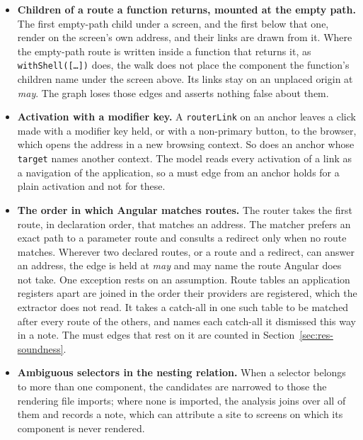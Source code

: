 \begin{itemize}[nosep]
execution model of Claim~\ref{claim:must}: the claim holds only on executions they do not describe. A
navigation is demoted when code that runs after it, before the event is handled, may start another
(Section~\ref{sec:model}). Whether that code may navigate is read through the calls the reader can
resolve to a body in the application.
Such a body is a member of the class, a function of the file, or a method the checker resolves on a
typed receiver. A call into a library, through a receiver the checker cannot type,
or into code loaded at run time is taken not to navigate.
A navigation followed by such a call can therefore be published as must although the call cancels it. The reader does not follow a navigation scheduled for later, nor the other listeners one event reaches.
\item \textbf{Children of a route a function returns, mounted at the empty path.} The first empty-path
child under a screen, and the first below that one, render on the screen's own address, and their links
are drawn from it. Where the empty-path route is written inside a function that returns it, as
\texttt{withShell([\ldots])} does, the walk does not place the component the function's children name
under the screen above.
Its links stay on an unplaced origin at \emph{may}. The graph loses those
edges and asserts nothing false about them.
\item \textbf{Activation with a modifier key.} A \texttt{routerLink} on an anchor leaves a click made
with a modifier key held, or with a non-primary button, to the browser, which opens the address in a new
browsing context.
So does an anchor whose \texttt{target} names another context. The model reads every
activation of a link as a navigation of the application, so a must edge from an anchor holds for a plain
activation and not for these.
\item \textbf{The order in which Angular matches routes.} The router takes the first route, in
declaration order, that matches an address.
The matcher prefers an exact path to a parameter route and consults a redirect only when no route
matches. Wherever two declared routes, or a route and a redirect,
can answer an address, the edge is held at \emph{may} and may name the route Angular does not take. One
exception rests on an assumption. Route tables an application registers apart are joined in the order
their providers are registered, which the extractor does not read. It takes a catch-all in one such table
to be matched after every route of the others, and names each catch-all it dismissed this way in a note.
The must edges that rest on it are counted in Section~\ref{sec:res-soundness}.
\item \textbf{Ambiguous selectors in the nesting relation.} When a selector belongs to more than one
component, the candidates are narrowed to those the rendering file imports; where none is imported, the
analysis joins over all of them and records a note, which can attribute a site to screens on which its
component is never rendered.
\end{itemize}


